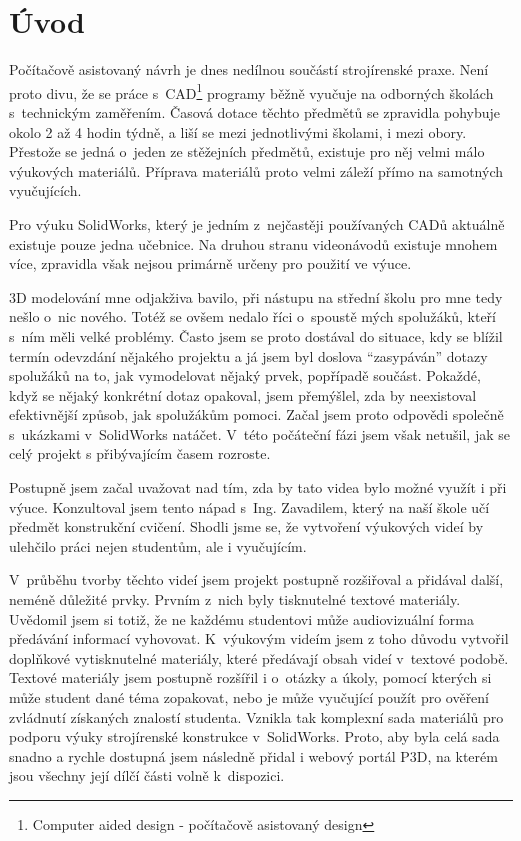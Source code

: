 \chapter*{Úvod}
Počítačově asistovaný návrh je dnes nedílnou součástí strojírenské praxe.
Není proto divu, že se práce s~CAD\footnote{Computer aided design - počítačově asistovaný design} programy běžně vyučuje na odborných školách s~technickým zaměřením.
Časová dotace těchto předmětů se zpravidla pohybuje okolo 2 až 4 hodin týdně, a liší se mezi jednotlivými školami, i mezi obory.
Přestože se jedná o~jeden ze stěžejních předmětů, existuje pro něj velmi málo výukových materiálů.
Příprava materiálů proto velmi záleží přímo na samotných vyučujících.

Pro výuku SolidWorks\cite{SOLIDWORKS}, který je jedním z~nejčastěji používaných CADů aktuálně existuje pouze jedna učebnice.
Na druhou stranu videonávodů existuje mnohem více, zpravidla však nejsou primárně určeny pro použití ve výuce.

3D modelování mne odjakživa bavilo, při nástupu na střední školu pro mne tedy nešlo o~nic nového.
Totéž se ovšem nedalo říci o~spoustě mých spolužáků, kteří s~ním měli velké problémy.
Často jsem se proto dostával do situace, kdy se blížil termín odevzdání nějakého projektu a já jsem byl doslova \enquote{zasypáván} dotazy spolužáků na to, jak vymodelovat nějaký prvek, popřípadě součást.
Pokaždé, když se nějaký konkrétní dotaz opakoval, jsem přemýšlel, zda by neexistoval efektivnější způsob, jak spolužákům pomoci.
Začal jsem proto odpovědi společně s~ukázkami v~SolidWorks natáčet.
V~této počáteční fázi jsem však netušil, jak se celý projekt s přibývajícím časem rozroste.

Postupně jsem začal uvažovat nad tím, zda by tato videa bylo možné využít i při výuce.
Konzultoval jsem tento nápad s~Ing. Zavadilem, který na naší škole učí předmět konstrukční cvičení.
Shodli jsme se, že vytvoření výukových videí by ulehčilo práci nejen studentům, ale i vyučujícím.

V~průběhu tvorby těchto videí jsem projekt postupně rozšiřoval a přidával další, neméně důležité prvky.
Prvním z~nich byly tisknutelné textové materiály.
Uvědomil jsem si totiž, že ne každému studentovi může audiovizuální forma předávání informací vyhovovat.
K~výukovým videím jsem z toho důvodu vytvořil doplňkové vytisknutelné materiály, které předávají obsah videí v~textové podobě.
Textové materiály jsem postupně rozšířil i o~otázky a úkoly, pomocí kterých si může student dané téma zopakovat, nebo je může vyučující použít pro ověření zvládnutí získaných znalostí studenta.
Vznikla tak komplexní sada materiálů pro podporu výuky strojírenské konstrukce v~SolidWorks.
Proto, aby byla celá sada snadno a rychle dostupná jsem následně přidal i webový portál P3D, na kterém jsou všechny její dílčí části volně k~dispozici.


